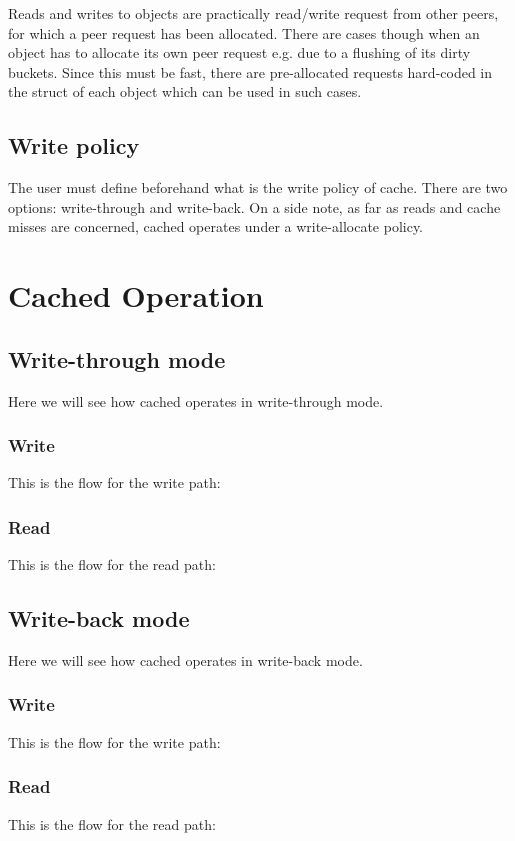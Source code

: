 Reads and writes to objects are practically read/write request from other
peers, for which a peer request has been allocated. There are cases though
when an object has to allocate its own peer request e.g. due to a flushing of
its dirty buckets. Since this must be fast, there are pre-allocated requests
hard-coded in the struct of each object which can be used in such cases.

\subsection{Write policy}

The user must define beforehand what is the write policy of cache. There are
two options: write-through and write-back. On a side note, as far as reads and
cache misses are concerned, cached operates under a write-allocate policy.

\section{Cached Operation}

\subsection{Write-through mode}

Here we will see how cached operates in write-through mode.

\subsubsection{Write}

This is the flow for the write path:

\subsubsection{Read}

This is the flow for the read path:

\subsection{Write-back mode}

Here we will see how cached operates in write-back mode.

\subsubsection{Write}

This is the flow for the write path:

\subsubsection{Read}

This is the flow for the read path:

